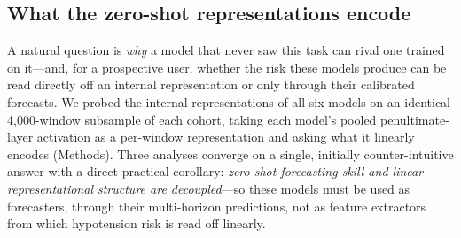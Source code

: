 \documentclass[11pt]{article}
\begin{document}
\begin{table}[ht]
\centering\footnotesize
\caption{\textbf{External validation: zero-shot TiRex-2 on VitalDB versus the independent MOVER cohort.} MOVER uses an invasive arterial MAP source at 60 s cadence with 2--3$\times$ higher hypotension prevalence. AUROC holds $\geq$0.85 across all horizons on MOVER.}
\label{tab:external}
\end{table}

\subsection{What the zero-shot representations encode}

A natural question is \emph{why} a model that never saw this task can rival one
trained on it---and, for a prospective user, whether the risk these models
produce can be read directly off an internal representation or only through
their calibrated forecasts. We probed the internal representations of all six
models on an identical 4{,}000-window subsample of each cohort, taking each
model's pooled penultimate-layer activation as a per-window representation and
asking what it linearly encodes (Methods). Three analyses converge on a single,
initially counter-intuitive answer with a direct practical corollary:
\emph{zero-shot forecasting skill and linear representational structure are
decoupled}---so these models must be used as forecasters, through their
multi-horizon predictions, not as feature extractors from which hypotension
risk is read off linearly.
\end{document}
